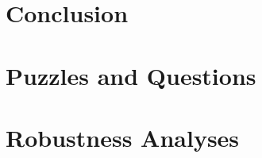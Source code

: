 \documentclass[./RiskyContrib.tex]{subfiles}
\begin{document}


\hypertarget{Conclusion}{}
\section{Conclusion}

\hypertarget{Puzzles-and-Questions}{}
\section{Puzzles and Questions}\label{sec:Puzzles}

\hypertarget{Robustness Analyses}{}
\section{Robustness Analyses}

\clearpage\vfill\eject

\onlyinsubfile{}
\end{document}
